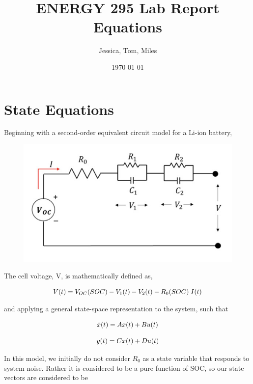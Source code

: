 \documentclass[12pt]{article}
\begin{document}
\title{ENERGY 295 Lab Report Equations}
\date{\today}
\author{Jessica, Tom, Miles}

\maketitle
\tableofcontents
\clearpage

\section{State Equations}
\par
Beginning with a second-order equivalent circuit model for a Li-ion battery,

\begin{figure}[h]
\centering
\includegraphics{ECM.png}
\end{figure}

The cell voltage, V, is mathematically defined as,

\begin{equation}
\centering
V(t) = V_{OC}(SOC) - V_1(t) - V_2(t) - R_0(SOC)\;I(t)
\end{equation}


and applying a general state-space representation to the system, such that

\begin{equation}
\centering
\dot{x}(t) = Ax(t) + Bu(t)
\end{equation}

\begin{equation}
\centering
y(t) =  Cx(t) + Du(t)
\end{equation}

In this model, we initially do not consider $R_0$ as a state variable that responds to system noise.  Rather it is considered to be a pure function of SOC, so our state vectors are considered to be 
\end{document}
